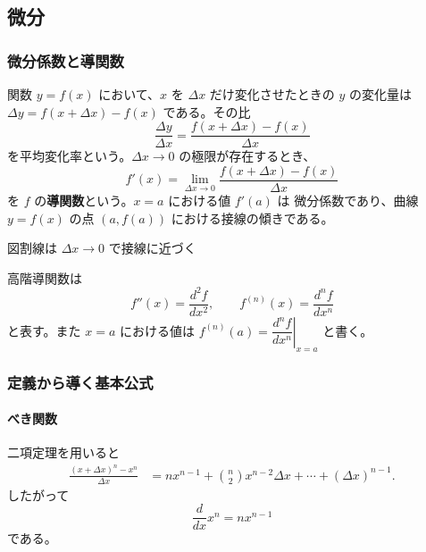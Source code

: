 \subsection{微分}

\subsubsection{微分係数と導関数}

関数 $y=f(x)$ において、$x$ を $\Delta x$ だけ変化させたときの
$y$ の変化量は $\Delta y=f(x+\Delta x)-f(x)$ である。その比
\[
 \frac{\Delta y}{\Delta x}
 =\frac{f(x+\Delta x)-f(x)}{\Delta x}
\]
を平均変化率という。$\Delta x\to0$ の極限が存在するとき、
\begin{equation}
 \boxed{f'(x)=\lim_{\Delta x\to0}
 \frac{f(x+\Delta x)-f(x)}{\Delta x}}
\end{equation}
を $f$ の\textbf{導関数}という。$x=a$ における値 $f'(a)$ は
微分係数であり、曲線 $y=f(x)$ の点 $(a,f(a))$ における接線の傾きである。

\begin{center}

\small 図\thefigure\quad 割線は $\Delta x\to0$ で接線に近づく
\end{center}

高階導関数は
\[
 f''(x)=\frac{d^2f}{dx^2},\qquad
 f^{(n)}(x)=\frac{d^nf}{dx^n}
\]
と表す。また $x=a$ における値は
$f^{(n)}(a)=\left.\dfrac{d^nf}{dx^n}\right|_{x=a}$ と書く。

\subsubsection{定義から導く基本公式}

\paragraph{べき関数}
二項定理を用いると
\begin{align*}
 \frac{(x+\Delta x)^n-x^n}{\Delta x}
 &=nx^{n-1}+\binom n2x^{n-2}\Delta x+\cdots+(\Delta x)^{n-1}.
\end{align*}
したがって
\begin{equation}
 \boxed{\frac{d}{dx}x^n=nx^{n-1}}
\end{equation}
である。


